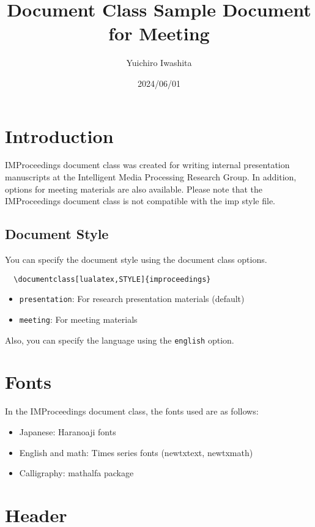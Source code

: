 \documentclass[lualatex,meeting,english]{improceedings}
\title{\pkg{IMProceedings} Document Class Sample Document for Meeting}
\date{2024/06/01}
\author{Yuichiro Iwashita}
\newcommand{\pkg}[1]{\textsf{#1}}
\newcommand{\code}[1]{\texttt{#1}}
\begin{document}
\maketitle

\section{Introduction}

\pkg{IMProceedings} document class was created for writing internal presentation manuscripts at the Intelligent Media Processing Research Group.
In addition, options for meeting materials are also available.
Please note that the \pkg{IMProceedings} document class is not compatible with the \pkg{imp} style file.

\subsection{Document Style}

You can specify the document style using the document class options.
\begin{verbatim}
  \documentclass[lualatex,STYLE]{improceedings}
\end{verbatim}
\begin{itemize}
  \item \code{presentation}: For research presentation materials (default)
  \item \code{meeting}: For meeting materials
\end{itemize}
Also, you can specify the language using the \code{english} option.

\section{Fonts}

In the \pkg{IMProceedings} document class, the fonts used are as follows:
\begin{itemize}
  \item Japanese: Haranoaji fonts
  \item English and math: Times series fonts (\pkg{newtxtext}, \pkg{newtxmath})
  \item Calligraphy: \pkg{mathalfa} package
\end{itemize}

\section{Header}
\end{document}

